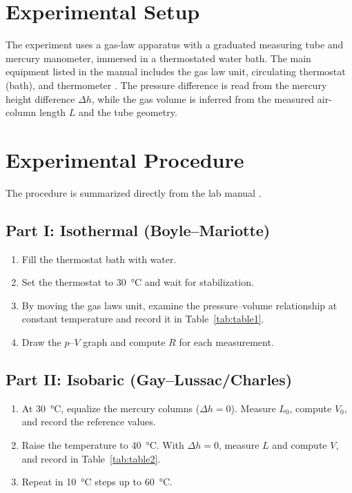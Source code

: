 \documentclass[journal]{IEEEtran}
\begin{document}
\section{Experimental Setup}
The experiment uses a gas-law apparatus with a graduated measuring tube and mercury manometer, immersed in a thermostated water bath. The main equipment listed in the manual includes the gas law unit, circulating thermostat (bath), and thermometer \cite{lab_manual}. The pressure difference is read from the mercury height difference $\Delta h$, while the gas volume is inferred from the measured air-column length $L$ and the tube geometry.

\section{Experimental Procedure}
The procedure is summarized directly from the lab manual \cite{lab_manual}.

\subsection{Part I: Isothermal (Boyle--Mariotte)}
\begin{enumerate}
	\item Fill the thermostat bath with water.
	\item Set the thermostat to \SI{30}{\celsius} and wait for stabilization.
	\item By moving the gas laws unit, examine the pressure--volume relationship at constant temperature and record it in Table~\ref{tab:table1}.
	\item Draw the $p$--$V$ graph and compute $R$ for each measurement.
\end{enumerate}

\subsection{Part II: Isobaric (Gay--Lussac/Charles)}
\begin{enumerate}
	\item At \SI{30}{\celsius}, equalize the mercury columns ($\Delta h=0$). Measure $L_0$, compute $V_0$, and record the reference values.
	\item Raise the temperature to \SI{40}{\celsius}. With $\Delta h=0$, measure $L$ and compute $V$, and record in Table~\ref{tab:table2}.
	\item Repeat in \SI{10}{\celsius} steps up to \SI{60}{\celsius}.
\end{enumerate}
\end{document}
